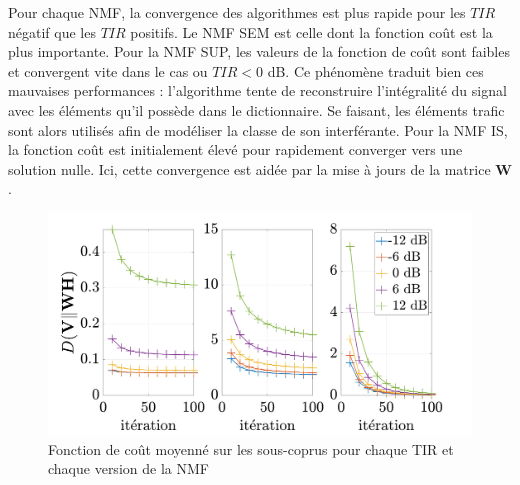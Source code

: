 Pour chaque NMF, la convergence des algorithmes est plus rapide pour les $TIR$ négatif que les $TIR$ positifs. Le NMF SEM est celle dont la fonction coût est la plus importante. 
Pour la NMF SUP, les valeurs de la fonction de coût sont faibles et convergent vite dans le cas ou $TIR < 0$ dB. Ce phénomène traduit bien ces mauvaises performances : l'algorithme tente de reconstruire l'intégralité du signal avec les éléments qu'il possède dans le dictionnaire. Se faisant, les éléments trafic sont alors utilisés afin de modéliser la classe de son interférante. Pour la NMF IS, la fonction coût est initialement élevé pour rapidement converger vers une solution nulle. Ici, cette convergence est aidée par la mise à jours de la matrice $\mathbf{W}$. 

\begin{figure}[hbtp]
\centering
\includegraphics[width=.8\linewidth]{./figures/resultats/ambiance_cost.pdf}
\caption{Fonction de coût moyenné sur les sous-coprus pour chaque TIR et chaque version de la NMF}
\end{figure}


%
